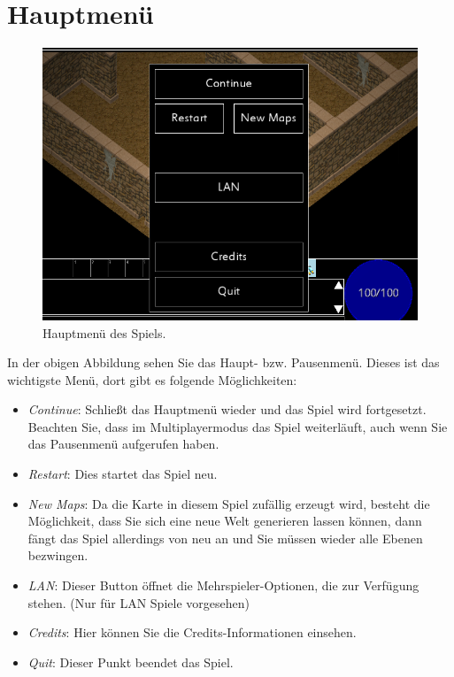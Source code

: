 \documentclass[12pt, a4paper]{scrreprt}
\begin{document}
\section{Hauptmenü}
\begin{figure}[h]
\includegraphics[width=\textwidth]{img/menu}
\caption{Hauptmenü des Spiels.}
\end{figure}
In der obigen Abbildung sehen Sie das Haupt- bzw. Pausenmenü. Dieses ist das wichtigste Menü, dort gibt es folgende Möglichkeiten:
\begin{itemize}
\item \textit{Continue}: Schließt das Hauptmenü wieder und das Spiel wird fortgesetzt. Beachten Sie, dass im Multiplayermodus das Spiel weiterläuft, auch wenn Sie das Pausenmenü aufgerufen haben.
\item \textit{Restart}: Dies startet das Spiel neu.
\item \textit{New Maps}: Da die Karte in diesem Spiel zufällig erzeugt wird, besteht die Möglichkeit, dass Sie sich eine neue Welt generieren lassen können, dann fängt das Spiel allerdings von neu an und Sie müssen wieder alle Ebenen bezwingen.
\item \textit{LAN}: Dieser Button öffnet die Mehrspieler-Optionen, die zur Verfügung stehen. (Nur für LAN Spiele vorgesehen)
\item \textit{Credits}: Hier können Sie die Credits-Informationen einsehen.
\item \textit{Quit}: Dieser Punkt beendet das Spiel.
\end{itemize}
\end{document}

